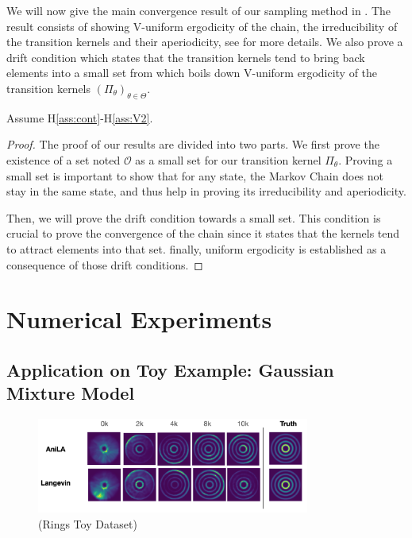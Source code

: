 \documentclass{article}
\begin{document}
We will now give the main convergence result of our sampling method in \algo.
The result consists of showing V-uniform ergodicity of the chain, the irreducibility of the transition kernels and their aperiodicity, see \cite{meyn2012markov} for more details. 
We also prove a drift condition which states that the transition kernels tend to bring back elements into a small set from which boils down V-uniform ergodicity of the transition kernels $(\Pi_\theta)_{\theta \in \Theta}$.


\begin{Theorem}
Assume H\ref{ass:cont}-H\ref{ass:V2}.

\end{Theorem}


\begin{proof}
The proof of our results are divided into two parts.
We first prove the existence of a set noted $\mathcal{O}$ as a small set for our transition kernel $\Pi_\theta$.
Proving a small set is important to show that for any state, the Markov Chain does not stay in the same state, and thus help in proving its irreducibility and aperiodicity.

Then, we will prove the drift condition towards a small set.
This condition is crucial to prove the convergence of the chain since it states that the kernels tend to attract elements into that set. 
finally, uniform ergodicity is established as a consequence of those drift conditions.

\end{proof}


\clearpage
\section{Numerical Experiments}\label{sec:numericals}

\subsection{Application on Toy Example: Gaussian Mixture Model}

\begin{figure}[H]
\begin{center}
\includegraphics[width=0.8\textwidth]{figs/rings}
\caption{(Rings Toy Dataset) }
\label{fig:results}
\end{center}
\end{figure}
\end{document}
